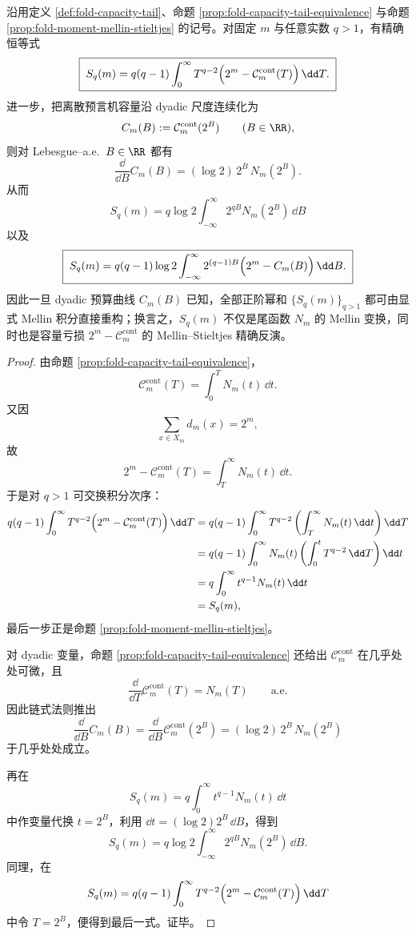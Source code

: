 \begin{theorem}\label{thm:xi-dyadic-oracle-capacity-mellin-recovery}
沿用定义 \ref{def:fold-capacity-tail}、命题 \ref{prop:fold-capacity-tail-equivalence} 与命题 \ref{prop:fold-moment-mellin-stieltjes} 的记号。对固定 \(m\) 与任意实数 \(q>1\)，有精确恒等式
\[
\boxed{\;
S_q(m)
=
q(q-1)\int_{0}^{\infty}T^{q-2}\Bigl(2^m-\mathcal C_m^{\mathrm{cont}}(T)\Bigr)\,\dd T.\;}
\]
进一步，把离散预言机容量沿 dyadic 尺度连续化为
\[
C_m(B):=\mathcal C_m^{\mathrm{cont}}(2^B)
\qquad(B\in \RR),
\]
则对 Lebesgue--a.e.\ \(B\in\RR\) 都有
\[
\boxed{\;
\frac{\dd}{\dd B}C_m(B)
=
(\log 2)\,2^B\,N_m(2^B).\;}
\]
从而
\[
\boxed{\;
S_q(m)
=
q\log 2\int_{-\infty}^{\infty}2^{qB}N_m(2^B)\,\dd B
\;}
\]
以及
\[
\boxed{\;
S_q(m)
=
q(q-1)\log 2
\int_{-\infty}^{\infty}
2^{(q-1)B}\Bigl(2^m-C_m(B)\Bigr)\,\dd B.\;}
\]
因此一旦 dyadic 预算曲线 \(C_m(B)\) 已知，全部正阶幂和 \(\{S_q(m)\}_{q>1}\) 都可由显式 Mellin 积分直接重构；换言之，\(S_q(m)\) 不仅是尾函数 \(N_m\) 的 Mellin 变换，同时也是容量亏损 \(2^m-\mathcal C_m^{\mathrm{cont}}\) 的 Mellin--Stieltjes 精确反演。
\end{theorem}
\begin{proof}
由命题 \ref{prop:fold-capacity-tail-equivalence}，
\[
\mathcal C_m^{\mathrm{cont}}(T)=\int_{0}^{T}N_m(t)\,\dd t.
\]
又因
\[
\sum_{x\in X_m}d_m(x)=2^m,
\]
故
\[
2^m-\mathcal C_m^{\mathrm{cont}}(T)
=
\int_{T}^{\infty}N_m(t)\,\dd t.
\]
于是对 \(q>1\) 可交换积分次序：
\[
\begin{aligned}
q(q-1)\int_{0}^{\infty}T^{q-2}\Bigl(2^m-\mathcal C_m^{\mathrm{cont}}(T)\Bigr)\,\dd T
&=
q(q-1)\int_{0}^{\infty}T^{q-2}\left(\int_{T}^{\infty}N_m(t)\,\dd t\right)\dd T\\
&=
q(q-1)\int_{0}^{\infty}N_m(t)\left(\int_{0}^{t}T^{q-2}\,\dd T\right)\dd t\\
&=
q\int_{0}^{\infty}t^{q-1}N_m(t)\,\dd t\\
&=
S_q(m),
\end{aligned}
\]
最后一步正是命题 \ref{prop:fold-moment-mellin-stieltjes}。
\par
对 dyadic 变量，命题 \ref{prop:fold-capacity-tail-equivalence} 还给出 \(\mathcal C_m^{\mathrm{cont}}\) 在几乎处处可微，且
\[
\frac{\dd}{\dd T}\mathcal C_m^{\mathrm{cont}}(T)=N_m(T)
\qquad\text{a.e.}
\]
因此链式法则推出
\[
\frac{\dd}{\dd B}C_m(B)
=
\frac{\dd}{\dd B}\mathcal C_m^{\mathrm{cont}}(2^B)
=
(\log 2)\,2^B\,N_m(2^B)
\]
于几乎处处成立。
\par
再在
\[
S_q(m)=q\int_{0}^{\infty}t^{q-1}N_m(t)\,\dd t
\]
中作变量代换 \(t=2^B\)，利用 \(\dd t=(\log 2)2^B\,\dd B\)，得到
\[
S_q(m)=q\log 2\int_{-\infty}^{\infty}2^{qB}N_m(2^B)\,\dd B.
\]
同理，在
\[
S_q(m)=q(q-1)\int_{0}^{\infty}T^{q-2}\Bigl(2^m-\mathcal C_m^{\mathrm{cont}}(T)\Bigr)\,\dd T
\]
中令 \(T=2^B\)，便得到最后一式。证毕。
\end{proof}

